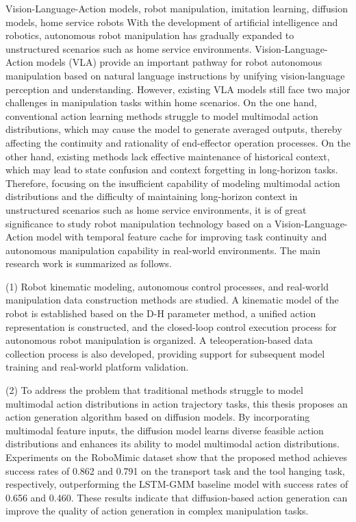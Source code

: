 \begin{englishabstract}{Vision-Language-Action models, robot manipulation, imitation learning, diffusion models, home service robots}
With the development of artificial intelligence and robotics, autonomous robot manipulation has gradually expanded to unstructured scenarios such as home service environments. Vision-Language-Action models (VLA) provide an important pathway for robot autonomous manipulation based on natural language instructions by unifying vision-language perception and understanding. However, existing VLA models still face two major challenges in manipulation tasks within home scenarios. On the one hand, conventional action learning methods struggle to model multimodal action distributions, which may cause the model to generate averaged outputs, thereby affecting the continuity and rationality of end-effector operation processes. On the other hand, existing methods lack effective maintenance of historical context, which may lead to state confusion and context forgetting in long-horizon tasks. Therefore, focusing on the insufficient capability of modeling multimodal action distributions and the difficulty of maintaining long-horizon context in unstructured scenarios such as home service environments, it is of great significance to study robot manipulation technology based on a Vision-Language-Action model with temporal feature cache for improving task continuity and autonomous manipulation capability in real-world environments. The main research work is summarized as follows.

(1) Robot kinematic modeling, autonomous control processes, and real-world manipulation data construction methods are studied. A kinematic model of the robot is established based on the D-H parameter method, a unified action representation is constructed, and the closed-loop control execution process for autonomous robot manipulation is organized. A teleoperation-based data collection process is also developed, providing support for subsequent model training and real-world platform validation.

(2) To address the problem that traditional methods struggle to model multimodal action distributions in action trajectory tasks, this thesis proposes an action generation algorithm based on diffusion models. By incorporating multimodal feature inputs, the diffusion model learns diverse feasible action distributions and enhances its ability to model multimodal action distributions. Experiments on the RoboMimic dataset show that the proposed method achieves success rates of 0.862 and 0.791 on the transport task and the tool hanging task, respectively, outperforming the LSTM-GMM baseline model with success rates of 0.656 and 0.460. These results indicate that diffusion-based action generation can improve the quality of action generation in complex manipulation tasks.


\end{englishabstract}
